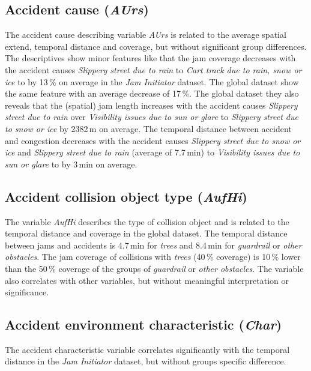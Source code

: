 \subsection{Accident cause (\textit{AUrs})}
\label{analysis_sum_AUrs}
The accident cause describing variable \textit{AUrs} is related to the average spatial extend, temporal distance and coverage, but without significant group differences. The descriptives show minor features like that the jam coverage decreases with the accident causes \textit{Slippery street due to rain} to \textit{Cart track due to rain, snow or ice} to by 13\,\% on average in the \textit{Jam Initiator} dataset. The global dataset show the same feature with an average decrease of 17\,\%. The global dataset they also reveals that the (spatial) jam length increases with the accident causes \textit{Slippery street due to rain} over \textit{Visibility issues due to sun or glare} to \textit{Slippery street due to snow or ice} by 2382\,m on average. The temporal distance between accident and congestion decreases with the accident causes \textit{Slippery street due to snow or ice} and \textit{Slippery street due to rain} (average of 7.7\,min) to \textit{Visibility issues due to sun or glare} to by 3\,min on average.

\subsection{Accident collision object type (\textit{AufHi})}
\label{analysis_sum_AufHi}
The variable \textit{AufHi} describes the type of collision object and is related to the temporal distance and coverage in the global dataset. The temporal distance between jams and accidents is 4.7\,min for \textit{trees} and 8.4\,min for \textit{guardrail} or \textit{other obstacles}. The jam coverage of collisions with \textit{trees} (40\,\% coverage) is 10\,\% lower than the 50\,\% coverage of the groups of \textit{guardrail} or \textit{other obstacles}. The variable also correlates with other variables, but without meaningful interpretation or significance.

\subsection{Accident environment characteristic (\textit{Char})}
\label{analysis_sum_Char}
The accident characteristic variable correlates significantly with the temporal distance in the \textit{Jam Initiator} dataset, but without groups specific difference.

